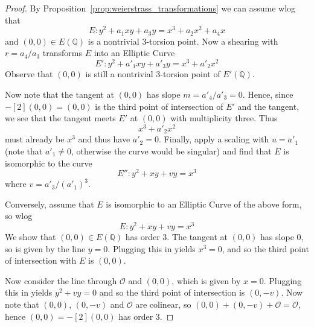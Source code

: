 \documentclass{scrartcl}
\newcommand{\Q}{\mathbb{Q}}
\renewcommand{\O}{\mathcal{O}}
\theoremstyle{definition}
\begin{document}
\begin{proof}
    By Proposition~\ref{prop:weierstrass_transformations} we can assume wlog that
    \begin{equation*}
        E: y^2 + a_1 x y + a_3 y = x^3 + a_2 x^2 + a_4 x
    \end{equation*}
    and $(0, 0) \in E(\Q)$ is a nontrivial 3-torsion point.
    Now a shearing with $r = a_4 / a_3$ transforms $E$ into an Elliptic Curve
    \begin{equation*}
        E': y^2 + a'_1 x y + a'_3 y = x^3 + a'_2 x^2
    \end{equation*}
    Observe that $(0, 0)$ is still a nontrivial 3-torsion point of $E'(\Q)$.

    Now note that the tangent at $(0, 0)$ has slope $m = a'_4/a'_3 = 0$.
    Hence, since $-[2](0, 0) = (0, 0)$ is the third point of intersection of $E'$ and the tangent, we see that the tangent meets $E'$ at $(0, 0)$ with multiplicity three.
    Thus
    \begin{equation*}
        x^3 + a'_2 x^2 
    \end{equation*}
    must already be $x^3$ and thus have $a'_2 = 0$.
    Finally, apply a scaling with $u = a'_1$ (note that $a'_1 \neq 0$, otherwise the curve would be singular) and find that $E$ is isomorphic to the curve
    \begin{equation*}
        E'': y^2 + x y + v y = x^3
    \end{equation*}
    where $v = a'_3 / (a'_1)^3$.

    Conversely, assume that $E$ is isomorphic to an Elliptic Curve of the above form, so wlog
    \begin{equation*}
        E: y^2 + x y + v y = x^3
    \end{equation*}
    We show that $(0, 0) \in E(\Q)$ has order 3.
    The tangent at $(0, 0)$ has slope $0$, so is given by the line $y = 0$.
    Plugging this in yields $x^3 = 0$, and so the third point of intersection with $E$ is $(0, 0)$.
    
    Now consider the line through $\O$ and $(0, 0)$, which is given by $x = 0$.
    Plugging this in yields $y^2 + v y = 0$ and so the third point of intersection is $(0, -v)$.
    Now note that $(0, 0)$, $(0, -v)$ and $\O$ are colinear, so $(0, 0) + (0, -v) + \O = \O$, hence $(0, 0) = -[2](0, 0)$ has order 3.
\end{proof}
\end{document}
